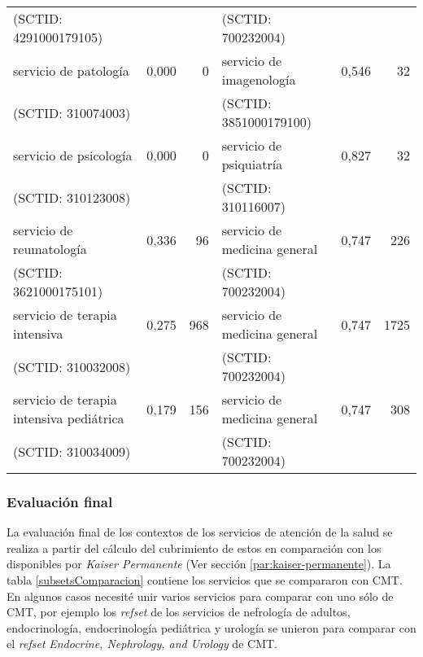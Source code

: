 \begin{table}[htb]
{\begin{tabular}{@{}lrrlrr@{}}
(SCTID: 4291000179105) &&& (SCTID: 700232004)\\
servicio de patología & 0,000 & 0 & servicio de imagenología & 0,546 & 32  \\
(SCTID: 310074003) &&& (SCTID: 3851000179100)\\
servicio de psicología & 0,000 & 0 & servicio de psiquiatría & 0,827 & 32  \\
(SCTID: 310123008) &&& (SCTID: 310116007)\\
servicio de reumatología & 0,336 & 96 & servicio de medicina general & 0,747 & 226  \\
(SCTID: 3621000175101) &&& (SCTID: 700232004)\\
servicio de terapia intensiva & 0,275 & 968 & servicio de medicina general & 0,747 & 1725  \\
(SCTID: 310032008) &&& (SCTID: 700232004)\\
servicio de terapia intensiva pediátrica & 0,179 & 156 & 
servicio de medicina general & 0,747 & 308  \\
(SCTID: 310034009) &&& (SCTID: 700232004)\\
 \bottomrule
\end{tabular}%
}
\end{table}

\subsubsection{Evaluación final}
La evaluación final de los contextos de los servicios de atención de la salud se realiza a partir del cálculo del cubrimiento de estos en comparación con los disponibles por \textit{Kaiser Permanente} (Ver sección \ref{par:kaiser-permanente}). La tabla \ref{subsetsComparacion} contiene los servicios que se compararon con \acrshort{CMT}. En algunos casos necesité unir varios servicios para comparar con uno sólo de \acrshort{CMT}, por ejemplo los \textit{\acrshort{refset}} de los servicios de nefrología de adultos, endocrinología, endocrinología pediátrica y urología se unieron para comparar con el \textit{\acrshort{refset}} \textit{Endocrine, Nephrology, and Urology} de \acrshort{CMT}.

